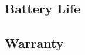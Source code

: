 \documentclass[../jb_user_manual.tex]{subfiles}
\begin{document}
\subsection{Battery Life}
\subsection{Warranty}
\end{document}
